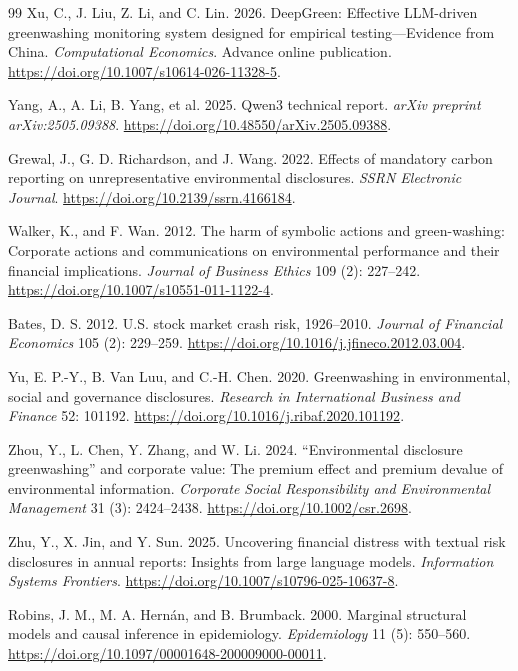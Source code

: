 \documentclass[11pt]{article}
\begin{document}
\begin{thebibliography}{99}
Xu, C., J. Liu, Z. Li, and C. Lin. 2026.
DeepGreen: Effective LLM-driven greenwashing monitoring system designed for empirical testing---Evidence from China.
\textit{Computational Economics}. Advance online publication. \url{https://doi.org/10.1007/s10614-026-11328-5}.

Yang, A., A. Li, B. Yang, et al. 2025.
Qwen3 technical report.
\textit{arXiv preprint arXiv:2505.09388}. \url{https://doi.org/10.48550/arXiv.2505.09388}.

Grewal, J., G. D. Richardson, and J. Wang. 2022.
Effects of mandatory carbon reporting on unrepresentative environmental disclosures.
\textit{SSRN Electronic Journal}. \url{https://doi.org/10.2139/ssrn.4166184}.

Walker, K., and F. Wan. 2012.
The harm of symbolic actions and green-washing: Corporate actions and communications on environmental performance and their financial implications.
\textit{Journal of Business Ethics} 109 (2): 227--242. \url{https://doi.org/10.1007/s10551-011-1122-4}.

Bates, D. S. 2012.
U.S. stock market crash risk, 1926--2010.
\textit{Journal of Financial Economics} 105 (2): 229--259. \url{https://doi.org/10.1016/j.jfineco.2012.03.004}.

Yu, E. P.-Y., B. Van Luu, and C.-H. Chen. 2020.
Greenwashing in environmental, social and governance disclosures.
\textit{Research in International Business and Finance} 52: 101192. \url{https://doi.org/10.1016/j.ribaf.2020.101192}.

Zhou, Y., L. Chen, Y. Zhang, and W. Li. 2024.
``Environmental disclosure greenwashing'' and corporate value: The premium effect and premium devalue of environmental information.
\textit{Corporate Social Responsibility and Environmental Management} 31 (3): 2424--2438. \url{https://doi.org/10.1002/csr.2698}.

Zhu, Y., X. Jin, and Y. Sun. 2025.
Uncovering financial distress with textual risk disclosures in annual reports: Insights from large language models.
\textit{Information Systems Frontiers}. \url{https://doi.org/10.1007/s10796-025-10637-8}.

Robins, J. M., M. A. Hern\'an, and B. Brumback. 2000.
Marginal structural models and causal inference in epidemiology.
\textit{Epidemiology} 11 (5): 550--560. \url{https://doi.org/10.1097/00001648-200009000-00011}.

\end{thebibliography}
\end{document}
